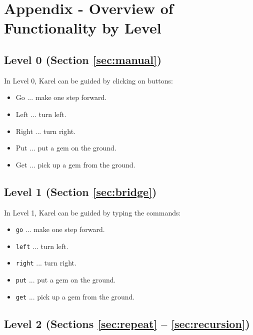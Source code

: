 
\section{Appendix - Overview of Functionality by Level}\label{sec:newfunc3}

\subsection[\ \ Level 0 (Section \ref{sec:manual})]{Level 0 (Section \ref{sec:manual})}

In Level 0, Karel can be guided by clicking on buttons:
\begin{itemize}
\item Go ... make one step forward.
\item Left ... turn left.
\item Right ... turn right.
\item Put ... put a gem on the ground.
\item Get ... pick up a gem from the ground.
\end{itemize}

\subsection[\ \ Level 1 (Section \ref{sec:bridge})]{Level 1 (Section \ref{sec:bridge})}

In Level 1, Karel can be guided by typing the commands:
\begin{itemize}
\item {\tt go} ... make one step forward.
\item {\tt left} ... turn left.
\item {\tt right} ... turn right.
\item {\tt put} ... put a gem on the ground.
\item {\tt get} ... pick up a gem from the ground.
\end{itemize}

\subsection[\ \ Level 2 (Sections \ref{sec:repeat} -- \ref{sec:recursion})]{Level 2 (Sections \ref{sec:repeat} -- \ref{sec:recursion})}

